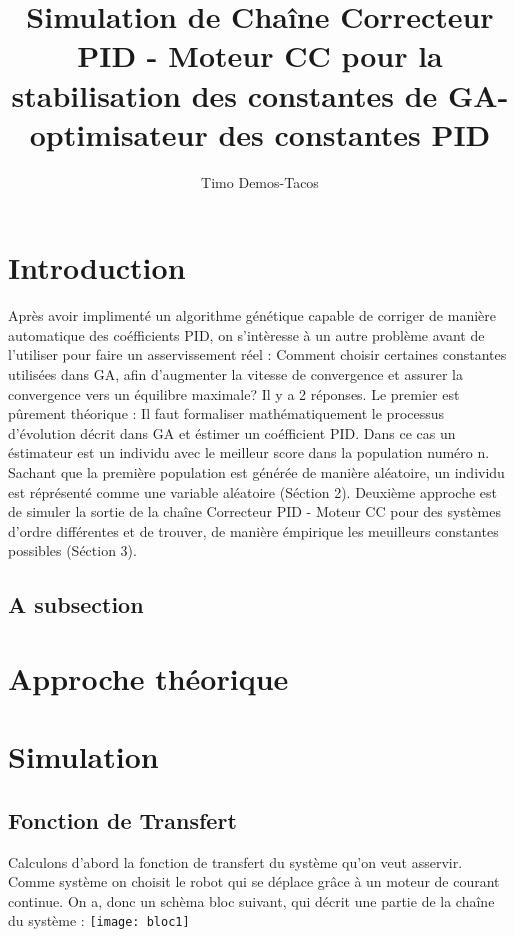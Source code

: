 \documentclass[11pt]{article} %
\title{Simulation de Chaîne Correcteur PID - Moteur CC pour la stabilisation des constantes de GA-optimisateur des constantes PID}
\author{Timo Demos-Tacos}
\begin{document}
\maketitle

\section{Introduction}

Après avoir implimenté un algorithme génétique capable de corriger de manière automatique des coéfficients PID, on s'intèresse à un autre problème avant de l'utiliser pour faire un asservissement réel : Comment choisir certaines constantes utilisées dans GA, afin d'augmenter la vitesse de convergence et assurer la convergence vers un équilibre maximale? Il y a 2 réponses. Le premier est pûrement théorique : Il faut formaliser mathématiquement le processus d'évolution décrit dans GA et éstimer un coéfficient PID. Dans ce cas un éstimateur est un individu avec le meilleur score dans la population numéro n. Sachant que la première population est générée de manière aléatoire, un individu est réprésenté comme une variable aléatoire (Séction 2). Deuxième approche est de simuler la sortie de la chaîne Correcteur PID - Moteur CC pour des systèmes d'ordre différentes et de trouver, de manière émpirique les meuilleurs constantes possibles (Séction 3).


\subsection{A subsection}

\section{Approche théorique}

\section{Simulation}

\subsection{Fonction de Transfert}

Calculons d'abord la fonction de transfert du système qu'on veut asservir. Comme système on choisit le robot qui se déplace grâce à un moteur de courant continue. On a, donc un schèma bloc suivant, qui décrit une partie de la chaîne du système :
\texttt{[image: bloc1]}
\end{document}
